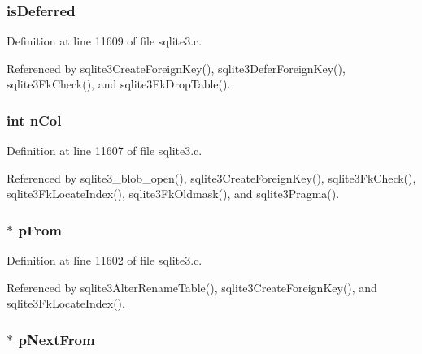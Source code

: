 \subsubsection[{is\+Deferred}]{ is\+Deferred}\label{struct_f_key_a05adbc8674f021661354ad607d00b0ac}


Definition at line 11609 of file sqlite3.\+c.



Referenced by sqlite3\+Create\+Foreign\+Key(), sqlite3\+Defer\+Foreign\+Key(), sqlite3\+Fk\+Check(), and sqlite3\+Fk\+Drop\+Table().

\hypertarget{struct_f_key_a354f4c2d87e40ee3eab3758d0716280e}{}
\subsubsection[{n\+Col}]{\setlength{\rightskip}{0pt plus 5cm}int n\+Col}\label{struct_f_key_a354f4c2d87e40ee3eab3758d0716280e}


Definition at line 11607 of file sqlite3.\+c.



Referenced by sqlite3\+\_\+blob\+\_\+open(), sqlite3\+Create\+Foreign\+Key(), sqlite3\+Fk\+Check(), sqlite3\+Fk\+Locate\+Index(), sqlite3\+Fk\+Oldmask(), and sqlite3\+Pragma().

\hypertarget{struct_f_key_a220ca0bcddde67932809283beba982f1}{}
\subsubsection[{p\+From}]{$\ast$ p\+From}\label{struct_f_key_a220ca0bcddde67932809283beba982f1}


Definition at line 11602 of file sqlite3.\+c.



Referenced by sqlite3\+Alter\+Rename\+Table(), sqlite3\+Create\+Foreign\+Key(), and sqlite3\+Fk\+Locate\+Index().

\hypertarget{struct_f_key_aef3af72659b611fc8a7858451ab133cc}{}
\subsubsection[{p\+Next\+From}]{$\ast$ p\+Next\+From}\label{struct_f_key_aef3af72659b611fc8a7858451ab133cc}


